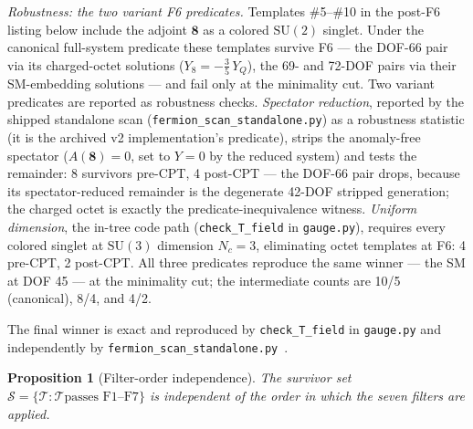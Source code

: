 \documentclass[11pt]{article}
\newtheorem{proposition}[theorem]{Proposition}
\theoremstyle{definition}
\newcommand{\SU}{\mathrm{SU}}
\begin{document}
\smallskip\noindent\textit{Robustness: the two variant F6 predicates.}\quad
Templates \#5--\#10 in the post-F6 listing below include the adjoint
$\mathbf{8}$ as a colored $\SU(2)$ singlet.  Under the canonical
full-system predicate these templates survive F6 --- the DOF-66 pair
via its charged-octet solutions ($Y_8 = -\tfrac{3}{5}\,Y_Q$), the 69-
and 72-DOF pairs via their SM-embedding solutions --- and fail only at
the minimality cut.  Two variant predicates are reported as robustness
checks.  \emph{Spectator reduction}, reported by the shipped
standalone scan (\texttt{fermion\_scan\_standalone.py}) as a
robustness statistic (it is the archived v2 implementation's
predicate), strips the
anomaly-free spectator ($A(\mathbf 8)=0$, set to $Y = 0$ by the
reduced system) and tests the remainder: 8 survivors pre-CPT, 4
post-CPT --- the DOF-66 pair drops, because its spectator-reduced
remainder is the degenerate 42-DOF stripped generation; the charged
octet is exactly the predicate-inequivalence witness.  \emph{Uniform
dimension}, the in-tree code path (\texttt{check\_T\_field} in
\texttt{gauge.py}), requires every colored singlet at $\SU(3)$
dimension $N_c = 3$, eliminating octet templates at F6: 4 pre-CPT, 2
post-CPT.  All three predicates reproduce the same winner --- the SM
at DOF 45 --- at the minimality cut; the intermediate counts are
10/5 (canonical), 8/4, and 4/2.

\smallskip\noindent The final winner is exact and reproduced by
\texttt{check\_T\_field} in \texttt{gauge.py} and independently by
\texttt{fermion\_scan\_standalone.py}~\cite{BrookeFermionScan}.

\begin{proposition}[Filter-order independence]\label{prop:filter_order}
The survivor set $\mathcal{S} = \{\mathcal{T} : \mathcal{T} \text{
passes F1--F7}\}$ is independent of the order in which the seven
filters are applied.
\end{proposition}
\end{document}
